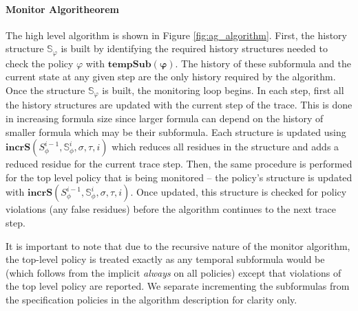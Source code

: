\paragraph{Monitor Algoritheorem}
The high level algorithm is shown in Figure \ref{fig:ag_algorithm}. First, the history structure $\mathbb{S}_{\varphi}$ is built by identifying the required history structures needed to check the policy $\varphi$ with $\mathbf{tempSub(\varphi)}$. 
The history of these subformula and the current state at any given step are the only history required by the algorithm. Once the structure $\mathbb{S}_{\varphi}$ is built, the monitoring loop begins. 
In each step, first all the history structures are updated with the current step of the trace. This is done in increasing formula size since larger formula can depend on the history of smaller formula which may be their subformula.
Each structure is updated using $\mathbf{incrS}(S^{i-1}_\phi,\mathbb{S}^i_\phi,\sigma,\tau,i)$ which reduces all residues in the structure and adds a reduced residue for the current trace step. 
Then, the same procedure is performed for the top level policy that is being monitored -- the policy's structure is updated with $\mathbf{incrS}(S^{i-1}_\phi,\mathbb{S}^i_\phi,\sigma,\tau,i)$.
Once updated, this structure is checked for policy violations (any false residues) before the algorithm continues to the next trace step.

It is important to note that due to the recursive nature of the monitor algorithm, the top-level policy is treated exactly as any temporal subformula would be (which follows from the implicit \emph{always} on all policies) except that violations of the top level policy are reported. We separate incrementing the subformulas from the specification policies in the algorithm description for clarity only.

